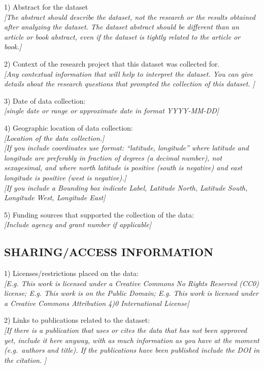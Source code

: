 \documentclass[]{article}
\begin{document}
1) Abstract for the dataset\\
\emph{{[}The abstract should describe the dataset, not the research or
the results obtained after analyzing the dataset. The dataset abstract
should be different than an article or book abstract, even if the
dataset is tightly related to the article or book.{]}}

2) Context of the research project that this dataset was collected
for.\\
\emph{{[}Any contextual information that will help to interpret the
dataset. You can give details about the research questions that prompted
the collection of this dataset. {]}}

3) Date of data collection:\\
\emph{{[}single date or range or approximate date in format
YYYY-MM-DD{]}}

4) Geographic location of data collection:\\
\emph{{[}Location of the data collection.{]}}\\
\emph{{[}If you include coordinates use format: ``latitude, longitude''
where latitude and longitude are preferably in fraction of degrees (a
decimal number), not sexagesimal, and where north latitude is positive
(south is negative) and east longitude is positive (west is
negative).{]}}\\
\emph{{[}If you include a Bounding box indicate Label, Latitude North,
Latitude South, Longitude West, Longitude East{]}}

5) Funding sources that supported the collection of the data:\\
\emph{{[}Include agency and grant number if applicable{]}}

\subsection{SHARING/ACCESS INFORMATION}\label{sharingaccess-information}

1) Licenses/restrictions placed on the data:\\
\emph{{[}E.g. This work is licensed under a Creative Commons No Rights
Reserved (CC0) license; E.g. This work is on the Public Domain; E.g.
This work is licensed under a Creative Commons Attribution 4)0
International License{]}}

2) Links to publications related to the dataset:\\
\emph{{[}If there is a publication that uses or cites the data that has
not been approved yet, include it here anyway, with as much information
as you have at the moment (e.g.~authors and title). If the publications
have been published include the DOI in the citation. {]}}
\end{document}
